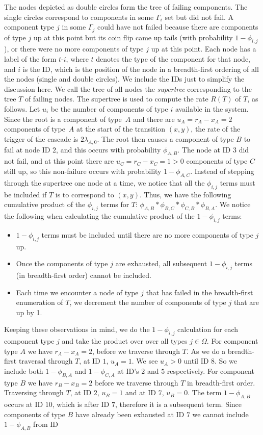 \documentclass[12pt]{article}
\begin{document}
The nodes depicted as double circles form the tree of failing components. The single circles correspond to components in some $\Gamma_i$ set but did not fail.  A component type $j$ in some $\Gamma_j$ could have not failed because there are components of type $j$ up at this point but its coin flip came up tails  (with probability $1 - \phi_{i, j}$), or there were no more components of type $j$ up at this point. Each node has a label of the form $t$-$i$, where $t$ denotes the type of the component for that node, and $i$ is the ID, which is the position of the node in a breadth-first ordering of all the nodes (single and double circles). We include the IDs just to simplify the discussion here. We call the tree of all nodes the \textit{supertree} corresponding to the tree $T$ of failing nodes. The supertree is used to compute the rate $R(T)$ of $T$, as follows. Let $u_i$ be the number of components of type $i$ available in the system. Since the root is a component of type~$A$ and there are $u_A = r_A - x_A = 2$ components of type~$A$ at the start of the transition $(x, y)$, the rate of the trigger of the cascade is $2 \lambda_{A, 0}$. The root then causes a component of type $B$ to fail at node ID $2$, and this occurs with probability $\phi_{A, B}$. The node at ID $3$ did not fail, and at this point there are $u_C = r_C - x_C = 1 > 0$ components of type $C$ still up, so this non-failure occurs with probability $1 - \phi_{A,C}$. Instead of stepping through the supertree one node at a time, we notice that all the $\phi_{i, j}$ terms must be included if $T$ is to correspond to $(x, y)$. Thus, we have the following cumulative product of the $\phi_{i, j}$ terms for $T$: $\phi_{A, B} * \phi_{B, C} * \phi_{C, B} * \phi_{B, A}$. We notice the following when calculating the cumulative product of the $1 - \phi_{i, j}$ terms: \begin{itemize} \item $1 - \phi_{i, j}$ terms must be included until there are no more components of type $j$ up. \item Once the components of type $j$ are exhausted, all subsequent $1 - \phi_{i, j}$ terms (in breadth-first order) cannot be included. \item Each time we encounter a node of type $j$ that has failed in the breadth-first enumeration of $T$, we decrement the number of components of type $j$ that are up by 1. \end{itemize} Keeping these observations in mind, we do the $1 - \phi_{i, j}$ calculation for each component type $j$ and take the product over over all types $j \in \Omega$. For component type $A$ we have $r_A - x_A  = 2$, before we traverse through $T$. As we do a breadth-first traversal through $T$, at ID $1$, $u_A = 1$. We see $u_A > 0$ until ID $8$. So we include both $1 - \phi_{B, A}$ and $1 - \phi_{C, A}$ at ID's $2$ and $5$ respectively. For component type $B$ we have $r_B - x_B  = 2$ before we traverse through $T$ in breadth-first order. Traversing through $T$, at ID $2$, $u_B = 1$ and at ID $7$, $u_B = 0$. The term $1 - \phi_{A, B}$ occurs at ID $10$, which is after ID $7$, therefore it is a subsequent term. Since components of type $B$ have already been exhausted at ID $7$ we cannot include $1 - \phi_{A, B}$ from ID 
\end{document}
